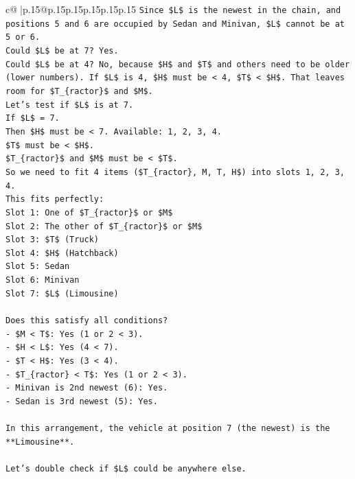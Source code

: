 \documentclass{article}
\begin{document}
{\begin{supertabular}{c@{$\;$}|p{.15\linewidth}@{}p{.15\linewidth}p{.15\linewidth}p{.15\linewidth}p{.15\linewidth}p{.15\linewidth}}
{{{\texttt{Since \$L\$ is the newest in the chain, and positions 5 and 6 are occupied by Sedan and Minivan, \$L\$ cannot be at 5 or 6.} \\
\texttt{Could \$L\$ be at 7? Yes.} \\
\texttt{Could \$L\$ be at 4? No, because \$H\$ and \$T\$ and others need to be older (lower numbers). If \$L\$ is 4, \$H\$ must be < 4, \$T\$ < \$H\$. That leaves room for \$T\_\{ractor\}\$ and \$M\$.} \\
\texttt{Let's test if \$L\$ is at 7.} \\
\texttt{If \$L\$ = 7.} \\
\texttt{Then \$H\$ must be < 7. Available: 1, 2, 3, 4.} \\
\texttt{\$T\$ must be < \$H\$.} \\
\texttt{\$T\_\{ractor\}\$ and \$M\$ must be < \$T\$.} \\
\texttt{So we need to fit 4 items (\$T\_\{ractor\}, M, T, H\$) into slots 1, 2, 3, 4.} \\
\texttt{This fits perfectly:} \\
\texttt{Slot 1: One of \$T\_\{ractor\}\$ or \$M\$} \\
\texttt{Slot 2: The other of \$T\_\{ractor\}\$ or \$M\$} \\
\texttt{Slot 3: \$T\$ (Truck)} \\
\texttt{Slot 4: \$H\$ (Hatchback)} \\
\texttt{Slot 5: Sedan} \\
\texttt{Slot 6: Minivan} \\
\texttt{Slot 7: \$L\$ (Limousine)} \\
\\ 
\texttt{Does this satisfy all conditions?} \\
\texttt{{-} \$M < T\$: Yes (1 or 2 < 3).} \\
\texttt{{-} \$H < L\$: Yes (4 < 7).} \\
\texttt{{-} \$T < H\$: Yes (3 < 4).} \\
\texttt{{-} \$T\_\{ractor\} < T\$: Yes (1 or 2 < 3).} \\
\texttt{{-} Minivan is 2nd newest (6): Yes.} \\
\texttt{{-} Sedan is 3rd newest (5): Yes.} \\
\\ 
\texttt{In this arrangement, the vehicle at position 7 (the newest) is the **Limousine**.} \\
\\ 
\texttt{Let's double check if \$L\$ could be anywhere else.} \\
}}}
\end{supertabular}}
\end{document}
